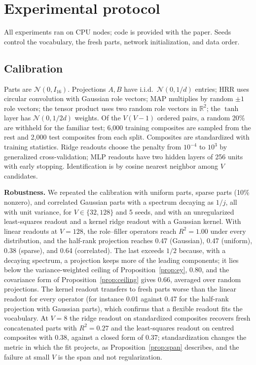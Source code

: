 \documentclass[10pt]{article}
\theoremstyle{plain}
\theoremstyle{remark}
\newcommand{\R}{\mathbb{R}}
\begin{document}
\section{Experimental protocol}
\label{app:protocol}

All experiments ran on CPU nodes; code is provided with the paper. Seeds control the vocabulary, the fresh parts, network initialization, and data order.

\subsection{Calibration}
Parts are $\mathcal{N}(0, I_{16})$. Projections $A, B$ have i.i.d.\ $\mathcal{N}(0, 1/d)$ entries; HRR uses circular convolution with Gaussian role vectors; MAP multiplies by random $\pm 1$ role vectors; the tensor product uses two random role vectors in $\R^2$; the $\tanh$ layer has $\mathcal{N}(0, 1/2d)$ weights. Of the $V(V-1)$ ordered pairs, a random 20\% are withheld for the familiar test; 6{,}000 training composites are sampled from the rest and 2{,}000 test composites from each split. Composites are standardized with training statistics. Ridge readouts choose the penalty from $10^{-4}$ to $10^{3}$ by generalized cross-validation; MLP readouts have two hidden layers of 256 units with early stopping. Identification is by cosine nearest neighbor among $V$ candidates.

\textbf{Robustness.} We repeated the calibration with uniform parts, sparse parts (10\% nonzero), and correlated Gaussian parts with a spectrum decaying as $1/j$, all with unit variance, for $V \in \{32, 128\}$ and 5 seeds, and with an unregularized least-squares readout and a kernel ridge readout with a Gaussian kernel. With linear readouts at $V = 128$, the role--filler operators reach $R^2 = 1.00$ under every distribution, and the half-rank projection reaches 0.47 (Gaussian), 0.47 (uniform), 0.38 (sparse), and 0.64 (correlated). The last exceeds $1/2$ because, with a decaying spectrum, a projection keeps more of the leading components; it lies below the variance-weighted ceiling of Proposition~\ref{prop:ey}, 0.80, and the covariance form of Proposition~\ref{prop:ceiling} gives 0.66, averaged over random projections. The kernel readout transfers to fresh parts worse than the linear readout for every operator (for instance 0.01 against 0.47 for the half-rank projection with Gaussian parts), which confirms that a flexible readout fits the vocabulary. At $V = 8$ the ridge readout on standardized composites recovers fresh concatenated parts with $R^2 = 0.27$ and the least-squares readout on centred composites with 0.38, against a closed form of 0.37; standardization changes the metric in which the fit projects, as Proposition~\ref{prop:span} describes, and the failure at small $V$ is the span and not regularization.
\end{document}
